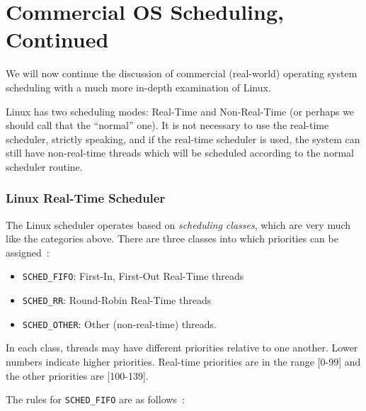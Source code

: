 




\section*{Commercial OS Scheduling, Continued}

We will now continue the discussion of commercial (real-world) operating system scheduling with a much more in-depth examination of Linux.

Linux has two scheduling modes: Real-Time and Non-Real-Time (or perhaps we should call that the ``normal'' one). It is not necessary to use the real-time scheduler, strictly speaking, and if the real-time scheduler is used, the system can still have non-real-time threads which will be scheduled according to the normal scheduler routine.

\subsubsection*{Linux Real-Time Scheduler}

The Linux scheduler operates based on \textit{scheduling classes}, which are very much like the categories above. There are three classes into which priorities can be assigned~\cite{osi}:

\begin{itemize}
	\item \texttt{SCHED\_FIFO}: First-In, First-Out Real-Time threads
	\item \texttt{SCHED\_RR}: Round-Robin Real-Time threads
	\item \texttt{SCHED\_OTHER}: Other (non-real-time) threads.
\end{itemize}

In each class, threads may have different priorities relative to one another. Lower numbers indicate higher priorities. Real-time priorities are in the range [0-99] and the other priorities are [100-139].

The rules for \texttt{SCHED\_FIFO} are as follows~\cite{osi}:

